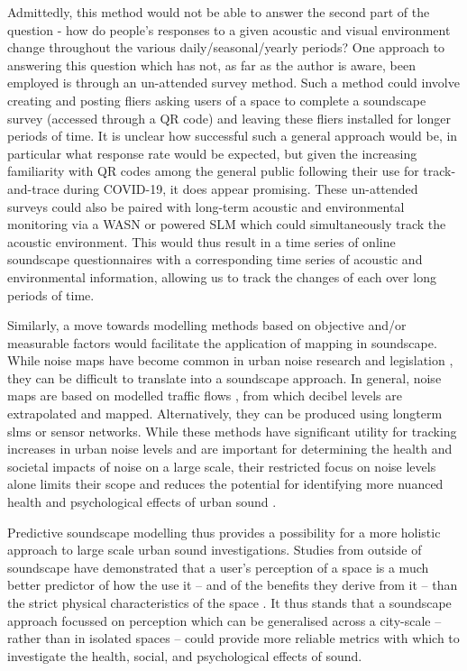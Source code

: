 Admittedly, this method would not be able to answer the second part of the question - how do people's responses to a given acoustic and visual environment change throughout the various daily/seasonal/yearly periods? One approach to answering this question which has not, as far as the author is aware, been employed is through an un-attended survey method. Such a method could involve creating and posting fliers asking users of a space to complete a soundscape survey (accessed through a QR code) and leaving these fliers installed for longer periods of time. It is unclear how successful such a general approach would be, in particular what response rate would be expected, but given the increasing familiarity with QR codes among the general public following their use for track-and-trace during COVID-19, it does appear promising. These un-attended surveys could also be paired with long-term acoustic and environmental monitoring via a WASN or powered SLM which could simultaneously track the acoustic environment. This would thus result in a time series of online soundscape questionnaires with a corresponding time series of acoustic and environmental information, allowing us to track the changes of each over long periods of time.


Similarly, a move towards modelling methods based on objective and/or measurable factors would facilitate the application of mapping in soundscape. While noise maps have become common in urban noise research and legislation \citep{EEA2020Environment} , they can be difficult to translate into a soundscape approach. In general, noise maps are based on modelled traffic flows \cit{}, from which decibel levels are extrapolated and mapped. Alternatively, they can be produced using longterm \gls{slm}s or sensor networks. While these methods have significant utility for tracking increases in urban noise levels and are important for determining the health and societal impacts of noise on a large scale, their restricted focus on noise levels alone limits their scope and reduces the potential for identifying more nuanced health and psychological effects of urban sound . 

Predictive soundscape modelling thus provides a possibility for a more holistic approach to large scale urban sound investigations. Studies from outside of soundscape have demonstrated that a user's perception of a space is a much better predictor of how the use it -- and of the benefits they derive from it -- than the strict physical characteristics of the space \citep{Kruize2019Exploring}. It thus stands that a soundscape approach focussed on perception which can be generalised across a city-scale -- rather than in isolated spaces -- could provide more reliable metrics with which to investigate the health, social, and psychological effects of sound.


